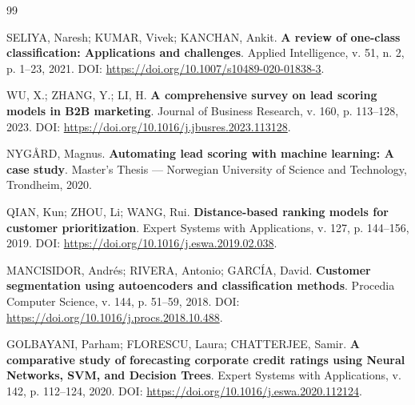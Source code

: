 \documentclass[
        oneside,      %
        english,			
        brazil			 
        ]{abntbibufjf}
\begin{document}

\textual















\begin{thebibliography}{99}

 SELIYA, Naresh; KUMAR, Vivek; KANCHAN, Ankit. 
\textbf{A review of one-class classification: Applications and challenges}. 
Applied Intelligence, v. 51, n. 2, p. 1–23, 2021. 
DOI: \url{https://doi.org/10.1007/s10489-020-01838-3}.

 WU, X.; ZHANG, Y.; LI, H. 
\textbf{A comprehensive survey on lead scoring models in B2B marketing}. 
Journal of Business Research, v. 160, p. 113–128, 2023. 
DOI: \url{https://doi.org/10.1016/j.jbusres.2023.113128}.

 NYGÅRD, Magnus. 
\textbf{Automating lead scoring with machine learning: A case study}. 
Master’s Thesis — Norwegian University of Science and Technology, Trondheim, 2020.

 QIAN, Kun; ZHOU, Li; WANG, Rui. 
\textbf{Distance-based ranking models for customer prioritization}. 
Expert Systems with Applications, v. 127, p. 144–156, 2019. 
DOI: \url{https://doi.org/10.1016/j.eswa.2019.02.038}.

 MANCISIDOR, Andrés; RIVERA, Antonio; GARCÍA, David. 
\textbf{Customer segmentation using autoencoders and classification methods}. 
Procedia Computer Science, v. 144, p. 51–59, 2018. 
DOI: \url{https://doi.org/10.1016/j.procs.2018.10.488}.

 GOLBAYANI, Parham; FLORESCU, Laura; CHATTERJEE, Samir. 
\textbf{A comparative study of forecasting corporate credit ratings using Neural Networks, SVM, and Decision Trees}. 
Expert Systems with Applications, v. 142, p. 112–124, 2020. 
DOI: \url{https://doi.org/10.1016/j.eswa.2020.112124}.


\end{thebibliography}
\end{document}
